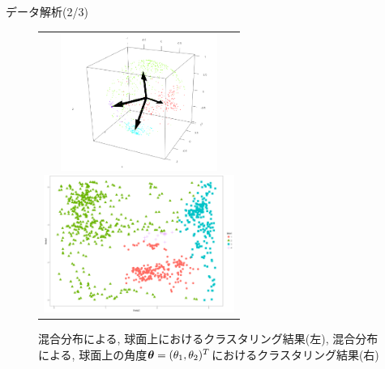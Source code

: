 \documentclass[dvipdfmx]{beamer} %
\newcommand{\bm}[1]{\mbox{\boldmath $#1$}}
\begin{document}
\begin{frame}{データ解析(2/3)}

\vspace{-1zh}
\begin{figure}[H]
\begin{tabular}{c}

\begin{minipage}{0.5\hsize}
\begin{center}
\includegraphics[clip,height= 45mm]{data/cluster_3d.png}
\end{center}
\end{minipage}
\hspace{-0.5cm}
\begin{minipage}{0.5\hsize}
\begin{center}
\includegraphics[clip,height= 45mm]{data/cluster_4.png}
\end{center}
\end{minipage}

\end{tabular}
\label{fig2}
\caption{混合分布による, 球面上におけるクラスタリング結果(左), 混合分布による, 球面上の角度$\bm \theta = (\theta_1, \theta_2)^T$におけるクラスタリング結果(右)}
\end{figure}
\end{frame}
\end{document}
